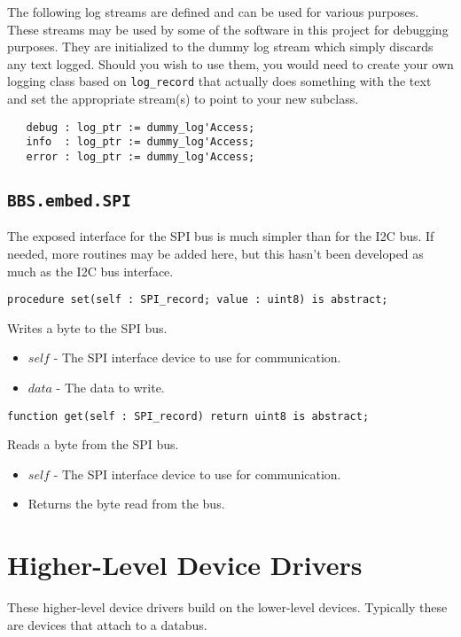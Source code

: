 \documentclass[10pt, openany]{book}
\newcommand{\indexfunc}[1]{\index[func]{#1}}
\newcommand{\package}[1]{\texttt{#1}}
\begin{document}
The following log streams are defined and can be used for various purposes.  These streams may be used by some of the software in this project for debugging purposes.  They are initialized to the dummy log stream which simply discards any text logged.  Should you wish to use them, you would need to create your own logging class based on \package{log\_record} that actually does something with the text and set the appropriate stream(s) to point to your new subclass.
\begin{lstlisting}
   debug : log_ptr := dummy_log'Access;
   info  : log_ptr := dummy_log'Access;
   error : log_ptr := dummy_log'Access;
\end{lstlisting}

\subsection{\package{BBS.embed.SPI}}
The exposed interface for the SPI bus is much simpler than for the I2C bus.  If needed, more routines may be added here, but this hasn't been developed as much as the I2C bus interface.
\begin{lstlisting}
procedure set(self : SPI_record; value : uint8) is abstract;
\end{lstlisting}
\indexfunc{set}
Writes a byte to the SPI bus.
\begin{itemize}
  \item $self$ - The SPI interface device to use for communication.
  \item $data$ - The data to write.
\end{itemize}
\begin{lstlisting}
function get(self : SPI_record) return uint8 is abstract;
\end{lstlisting}
\indexfunc{get}
Reads a byte from the SPI bus.
\begin{itemize}
  \item $self$ - The SPI interface device to use for communication.
  \item Returns the byte read from the bus.
\end{itemize}

\section{Higher-Level Device Drivers}
These higher-level device drivers build on the lower-level devices.  Typically these are devices that attach to a databus.
\end{document}
